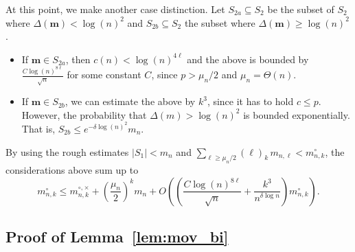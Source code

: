 \documentclass[reqno, 11pt]{amsart}
\theoremstyle{definition}
\theoremstyle{remark}
\newcommand{\map}[1]{\textbf{#1}}
\numberwithin{equation}{section}
\begin{document}
At this point, we make another case distinction. Let $S_{2a} \subseteq S_2$ be the subset of $S_2$ where $\Delta(\map{m}) < \log(n)^2$ and $S_{2b} \subseteq S_2$ the subset where $\Delta(\map{m}) \geq \log(n)^2$.
\begin{itemize}
    \item 

If $\map{m} \in S_{2a}$, then $c(n) < \log(n)^{4\ell}$ and the above is bounded by $\frac{C\log(n)^{8\ell}}{\sqrt{n}}$ for some constant $C$, since $p>\mu_n/2$ and $\mu_n = \Theta(n)$.

\item If $\map{m} \in S_{2b}$, we can estimate the above by $k^3$, since it has to hold $c\leq p$. However, the probability that $\Delta(m) > \log(n)^2$ is bounded exponentially. That is, $S_{2b} \leq e^{-\delta \log(n)^2}m_n$.
\end{itemize}

By using the rough estimates $|S_1| < m_n$ and $\sum_{\ell \geq \mu_n/2} (\ell)_k\, m_{n,\ell} < m_{n,k}^\circ$, the considerations above sum up to
\[
     m_{n,k}^\circ \leq m_{n,k}^{\circ,\times} + \left(\frac{\mu_n}{2}\right)^k m_{n} + O\left(\left(\frac{C\log(n)^{8\ell}}{\sqrt{n}}+\frac{k^3}{n^{
     \delta \log n
     }}\right)m_{n,k}^\circ\right).
\]


\subsection{Proof of Lemma~\ref{lem:mov_bi}}
\end{document}
